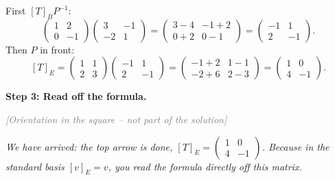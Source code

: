 \documentclass[a4paper,12pt]{article}
\newcommand{\orient}{\textcolor{gray}{\small\textit{[Orientation in the square -- not part of the solution]}}}
\begin{document}
First $[T]_B P^{-1}$:
\[
\begin{pmatrix} 1 & 2 \\ 0 & -1 \end{pmatrix}\begin{pmatrix} 3 & -1 \\ -2 & 1 \end{pmatrix}
= \begin{pmatrix} 3 - 4 & -1 + 2 \\ 0 + 2 & 0 - 1 \end{pmatrix}
= \begin{pmatrix} -1 & 1 \\ 2 & -1 \end{pmatrix}.
\]
Then $P$ in front:
\[
[T]_E = \begin{pmatrix} 1 & 1 \\ 2 & 3 \end{pmatrix}\begin{pmatrix} -1 & 1 \\ 2 & -1 \end{pmatrix}
= \begin{pmatrix} -1 + 2 & 1 - 1 \\ -2 + 6 & 2 - 3 \end{pmatrix}
= \begin{pmatrix} 1 & 0 \\ 4 & -1 \end{pmatrix}.
\]

\textbf{Step 3: Read off the formula.}

\orient
\begin{center}
\end{center}
{\small\itshape\color{gray} We have arrived: the top arrow is done, $[T]_E = \left(\begin{smallmatrix}1&0\\4&-1\end{smallmatrix}\right)$. Because in the standard basis $[v]_E = v$, you read the formula directly off this matrix.}
\end{document}
